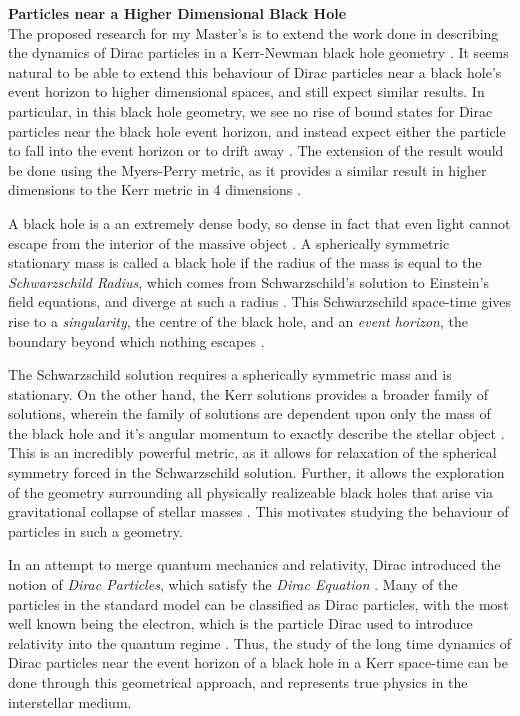 \documentclass[12pt]{article}
\begin{document}
\textbf{Particles near a Higher Dimensional Black Hole} \\
The proposed research for my Master's is to extend the work done in describing the dynamics of Dirac particles in a Kerr-Newman black hole geometry \cite{atmp}. It seems natural to be able to extend this behaviour of Dirac particles near a black hole's event horizon to higher dimensional spaces, and still expect similar results. In particular, in this black hole geometry, we see no rise of bound states for Dirac particles near the black hole event horizon, and instead expect either the particle to fall into the event horizon or to drift away \cite{cpam}. The extension of the result would be done using the Myers-Perry metric, as it provides a similar result in higher dimensions to the Kerr metric in 4 dimensions \cite{myersperry}.

A black hole is a an extremely dense body, so dense in fact that even light cannot escape from the interior of the massive object \cite{gr}. A spherically symmetric stationary mass is called a black hole if the radius of the mass is equal to the \textit{Schwarzschild Radius}, which comes from Schwarzschild's solution to Einstein's field equations, and diverge at such a radius \cite{gr}. This Schwarzschild space-time gives rise to a \textit{singularity}, the centre of the black hole, and an \textit{event horizon}, the boundary beyond which nothing escapes \cite{mbh}.

The Schwarzschild solution requires a spherically symmetric mass and is stationary. On the other hand, the Kerr solutions provides a broader family of solutions, wherein the family of solutions are dependent upon only the mass of the black hole and it's angular momentum to exactly describe the stellar object \cite{mbh}. This is an incredibly powerful metric, as it allows for relaxation of the spherical symmetry forced in the Schwarzschild solution. Further, it allows the exploration of the geometry surrounding all physically realizeable black holes that arise via gravitational collapse of stellar masses \cite{mbh}. This motivates studying the behaviour of particles in such a geometry.

In an attempt to merge quantum mechanics and relativity, Dirac introduced the notion of \textit{Dirac Particles}, which satisfy the \textit{Dirac Equation} \cite{dirac}. Many of the particles in the standard model can be classified as Dirac particles, with the most well known being the electron, which is the particle Dirac used to introduce relativity into the quantum regime \cite{dirac}. Thus, the study of the long time dynamics of Dirac particles near the event horizon of a black hole in a Kerr space-time can be done through this geometrical approach, and represents true physics in the interstellar medium.
\end{document}
